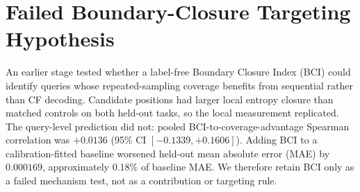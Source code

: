\documentclass[11pt]{article}
\begin{document}
\begin{table}[h]
\caption{Temperature-by-schedule diagnostics (equal-task pooled; first 32 rollouts per cell). MV@32 is tie-aware majority-vote accuracy over 32 rollouts, Words is mean decoded whitespace length, and Unique@32 is the mean number of distinct parsed answers per query.}
\label{tab:temperature-diagnostics}
\centering
\small
{}
\end{table}

\begin{table}[h]
\caption{Mean model-distribution entropy of the selected position (Sel.) and of all eligible positions (Elig.), from rollouts 0 and 1 of every held-out query (400 traces of 256 commits per cell).}
\label{tab:temperature-trace}
\centering
\small
{}
\end{table}

\section{Failed Boundary-Closure Targeting Hypothesis}
\label{app:bci}

An earlier stage tested whether a label-free Boundary Closure Index (BCI) could identify queries whose repeated-sampling coverage benefits from sequential rather than CF decoding. Candidate positions had larger local entropy closure than matched controls on both held-out tasks, so the local measurement replicated. The query-level prediction did not: pooled BCI-to-coverage-advantage Spearman correlation was $+0.0136$ (95\% CI $[-0.1339,+0.1606]$). Adding BCI to a calibration-fitted baseline worsened held-out mean absolute error (MAE) by $0.000169$, approximately 0.18\% of baseline MAE. We therefore retain BCI only as a failed mechanism test, not as a contribution or targeting rule.
\end{document}
